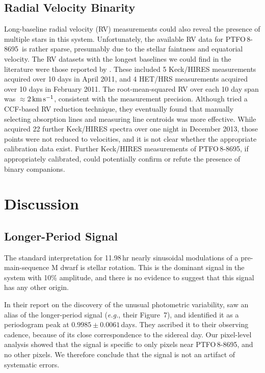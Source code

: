 \documentclass[12pt,twocolumn,tighten]{aastex62}
\newcommand{\ptfo}{PTFO$\,$8-8695}
\begin{document}
\subsection{Radial Velocity Binarity}

Long-baseline radial velocity (RV) measurements could also reveal
the presence of multiple stars in this system.
Unfortunately,
the available RV data for \ptfo\ is rather sparse, presumably due to the
stellar faintness and equatorial velocity.
The RV datasets with the longest baselines we could find
in the literature were those reported by \citet{van_eyken_ptf_2012}.
These included 5 Keck/HIRES measurements acquired
over 10 days in April 2011, and 4 HET/HRS measurements acquired over
10 days in February 2011.  The root-mean-squared RV over each 10 day
span was $\approx$$2\,{\rm km}\,{\rm s}^{-1}$, consistent with the
measurement precision.  Although \citet{van_eyken_ptf_2012} tried a
CCF-based RV reduction technique, they eventually found that manually
selecting absorption lines and measuring line centroids was more
effective.  While \citet{yu_tests_2015} acquired 22 further Keck/HIRES
spectra over one night in December 2013, those points were not reduced
to velocities, and it is not clear whether the appropriate calibration
data exist.  Further Keck/HIRES measurements of \ptfo, if
appropriately calibrated, could potentially confirm or refute the
presence of binary companions.

\section{Discussion}
\label{sec:discussion}

\subsection{Longer-Period Signal}

The standard interpretation for 11.98$\,$hr nearly sinusoidal
modulations of a pre-main-sequence M dwarf is stellar rotation.  This
is the dominant signal in the system with 10\% amplitude, and there is
no evidence to suggest that this signal has any other origin.

In their report on the discovery of the unusual photometric
variability, \citet{van_eyken_ptf_2012} saw an alias of the
longer-period signal ({\it e.g.}, their Figure~7), and identified it
as a periodogram peak at $0.9985 \pm 0.0061\,$days. They ascribed it
to their observing cadence, because of its close correspondence to the
sidereal day.  Our pixel-level analysis showed that the signal is
specific to only pixels near \ptfo, and no other pixels.  We therefore
conclude that the signal is not an artifact of systematic errors.
\end{document}

